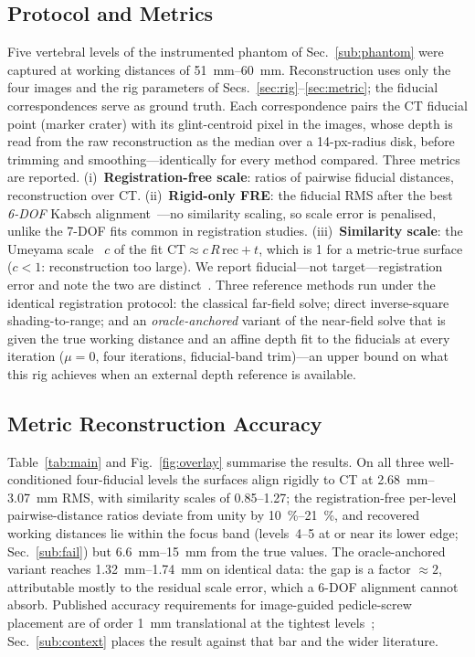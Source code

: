 \documentclass[conference]{IEEEtran}
\begin{document}
\subsection{Protocol and Metrics}\label{sub:setup}
Five vertebral levels of the instrumented phantom of
Sec.~\ref{sub:phantom} were captured at working distances of
\SIrange{51}{60}{\milli\meter}.  Reconstruction uses only the four images
and the rig parameters of Secs.~\ref{sec:rig}--\ref{sec:metric}; the
fiducial correspondences serve as ground truth.  Each correspondence
pairs the CT fiducial point (marker crater) with its glint-centroid pixel
in the images, whose depth is read from the raw reconstruction as the
median over a 14-px-radius disk, before trimming and
smoothing---identically for every method compared.  Three metrics are
reported.  (i)~\textbf{Registration-free scale}: ratios of pairwise
fiducial distances, reconstruction over CT.  (ii)~\textbf{Rigid-only
FRE}: the fiducial RMS after the best \emph{6-DOF} Kabsch
alignment~\cite{kabsch1976}---no similarity scaling, so scale error is
penalised, unlike the 7-DOF fits common in registration studies.
(iii)~\textbf{Similarity scale}: the Umeyama scale~\cite{umeyama1991} $c$
of the fit $\mathrm{CT}\approx c\,R\,\mathrm{rec}+t$, which is 1 for a
metric-true surface ($c<1$: reconstruction too large).  We report
fiducial---not target---registration error and note the two are
distinct~\cite{fitzpatrick1998}.  Three reference methods run under the
identical registration protocol: the classical far-field solve; direct
inverse-square shading-to-range; and an \emph{oracle-anchored} variant of
the near-field solve that is given the true working distance and an
affine depth fit to the fiducials at every iteration ($\mu=0$, four
iterations, fiducial-band trim)---an upper bound on what this rig
achieves when an external depth reference is available.

\subsection{Metric Reconstruction Accuracy}\label{sub:main}
Table~\ref{tab:main} and Fig.~\ref{fig:overlay} summarise the results.
On all three well-conditioned four-fiducial levels the surfaces align
rigidly to CT at \SIrange{2.68}{3.07}{\milli\meter} RMS, with similarity
scales of 0.85--1.27; the registration-free per-level pairwise-distance
ratios deviate from unity by \SIrange{10}{21}{\percent}, and recovered
working distances lie within the focus band (levels~4--5 at or near its
lower edge; Sec.~\ref{sub:fail}) but \SIrange{6.6}{15}{\milli\meter} from
the true values.  The oracle-anchored variant reaches
\SIrange{1.32}{1.74}{\milli\meter} on identical data: the gap is a factor
$\approx\!2$, attributable mostly to the residual scale error, which a 6-DOF
alignment cannot absorb.  Published accuracy
requirements for image-guided pedicle-screw placement are of order
\SI{1}{\milli\meter} translational at the tightest
levels~\cite{rampersaud2001}; Sec.~\ref{sub:context} places the result
against that bar and the wider literature.
\end{document}
